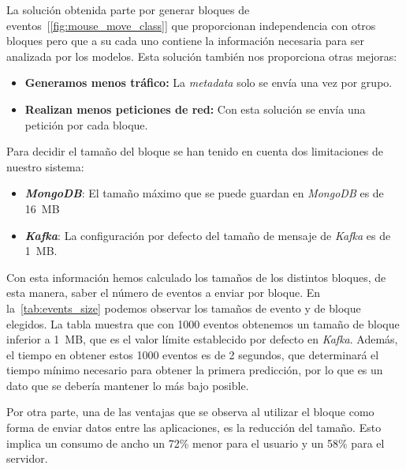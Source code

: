 La solución obtenida parte por generar bloques de eventos~[\cref{fig:mouse_move_class}] que proporcionan independencia con otros bloques pero que a su cada uno contiene la información necesaria para ser analizada por los modelos. Esta solución también nos proporciona otras mejoras:

\begin{itemize}[noitemsep]
    \item \textbf{Generamos menos tráfico:} La \textit{metadata} solo se envía una vez por grupo.
    \item \textbf{Realizan menos peticiones de red:} Con esta solución se envía una petición por cada bloque.
\end{itemize}

Para decidir el tamaño del bloque se han tenido en cuenta dos limitaciones de nuestro sistema:

\begin{itemize}[noitemsep]
    \item \textbf{\textit{MongoDB}}: El tamaño máximo que se puede guardan en \textit{MongoDB} es de 16~MB
    \item \textbf{\textit{Kafka}}: La configuración por defecto del tamaño de mensaje de \textit{Kafka} es de 1~MB.
\end{itemize}

Con esta información hemos calculado los tamaños de los distintos bloques, de esta manera, saber el número de eventos a enviar por bloque. En la~\cref{tab:events_size} podemos observar los tamaños de evento y de bloque elegidos. La tabla muestra que con 1000 eventos obtenemos un tamaño de bloque inferior a 1~MB, que es el valor límite establecido por defecto en \textit{Kafka}. Además, el tiempo en obtener estos 1000 eventos es de 2 segundos, que determinará el tiempo mínimo necesario para obtener la primera predicción, por lo que es un dato que se debería mantener lo más bajo posible.

Por otra parte, una de las ventajas que se observa al utilizar el bloque como forma de enviar datos entre las aplicaciones, es la reducción del tamaño. Esto implica un consumo de ancho un 72\% menor para el usuario y un 58\% para el servidor.


